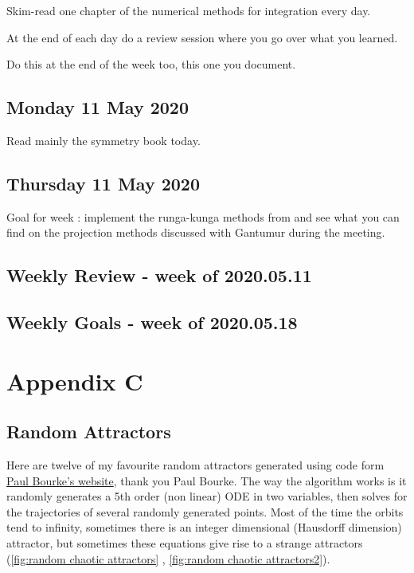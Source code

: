 \documentclass[12pt]{article}
\begin{document}
Skim-read one chapter of the numerical methods for integration every day. 

At the end of each day do a review session where you go over what you learned. 

Do this at the end of the week too, this one you document. 

\subsection{Monday 11 May 2020}
Read mainly the symmetry book today. 

\subsection{Thursday 11 May 2020}
Goal for week : implement the runga-kunga methods from \cite{Duruisseaux} and see what you can find on the projection methods discussed with Gantumur during the meeting. 


\subsection{Weekly Review - week of 2020.05.11}

\subsection{Weekly Goals - week of 2020.05.18}

\section{Appendix C}\label{appendix c}
\subsection{Random Attractors}
Here are twelve of my favourite random attractors generated using code form \href{http://paulbourke.net/fractals/lyapunov/}{Paul Bourke's website}, thank you Paul Bourke. The way the algorithm works is it randomly generates a 5th order (non linear) ODE in two variables, then solves for the trajectories of several randomly generated points. Most of the time the orbits tend to infinity, sometimes there is an integer dimensional (Hausdorff dimension) attractor, but sometimes these equations give rise to a strange attractors (\ref{fig:random chaotic attractors} , \ref{fig:random chaotic attractors2}). 
\end{document}
